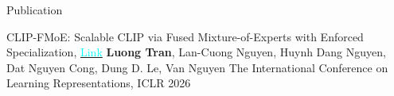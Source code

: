 \documentclass{resume} %
\begin{document}
\begin{rSection}{Publication}




\begin{rSubsectionPaper}
    {CLIP-FMoE: Scalable CLIP via Fused Mixture-of-Experts with Enforced Specialization, \href{https://openreview.net/forum?id=RErUA45pI9}{\textcolor{cyan}{Link}}}
    {\textbf{Luong Tran}, Lan-Cuong Nguyen, Huynh Dang Nguyen, Dat Nguyen Cong, Dung D. Le, Van Nguyen}
    {The International Conference on Learning Representations, ICLR 2026}
    {}
    

\end{rSubsectionPaper}
\end{rSection}
\end{document}
